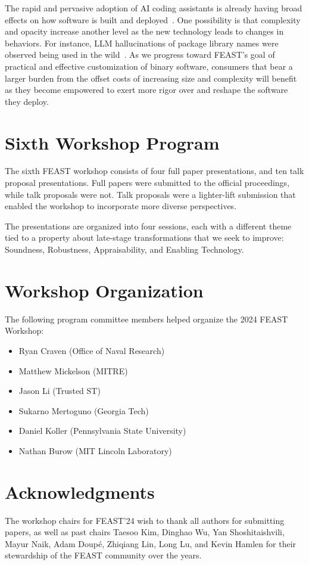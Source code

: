 \documentclass[sigconf]{acmart}
\begin{document}
The rapid and pervasive adoption of AI coding assistants is already having broad
effects on how software is built and deployed~\cite{klemmer2024}.  One
possibility is that complexity and opacity increase another level as the new technology
leads to changes in behaviors.  For instance, LLM hallucinations of package
library names were observed being used in the wild~\cite{lanyado2024}. As we
progress toward FEAST's goal of practical and effective customization of binary
software, consumers that bear a larger burden from the offset costs of
increasing size and complexity will benefit as they become empowered to exert
more rigor over and reshape the software they deploy.

\section{Sixth Workshop Program}
The sixth FEAST workshop consists of four full paper presentations, and ten talk
proposal presentations.  Full papers were submitted to the official proceedings, while
talk proposals were not.  Talk proposals were a lighter-lift submission that enabled
the workshop to incorporate more diverse perspectives.

The presentations are organized into four sessions, each with a different theme
tied to a property about late-stage transformations that we seek to improve:
Soundness, Robustness, Appraisability, and Enabling Technology.

\section{Workshop Organization}
The following program committee members helped organize the 2024 FEAST Workshop:
\begin{itemize}
  \item Ryan Craven (Office of Naval Research)
  \item Matthew Mickelson (MITRE)
  \item Jason Li (Trusted ST)
  \item Sukarno Mertoguno (Georgia Tech)
  \item Daniel Koller (Pennsylvania State University)
  \item Nathan Burow (MIT Lincoln Laboratory)
\end{itemize}

\section{Acknowledgments}
The workshop chairs for FEAST'24 wish to thank all authors for submitting papers,
as well as past chairs
Taesoo Kim, Dinghao Wu,
Yan Shoshitaishvili, Mayur Naik,
Adam Doup\'e, Zhiqiang Lin,
Long Lu, and Kevin Hamlen
for their stewardship of the FEAST community over the years.


\balance

\end{document}
